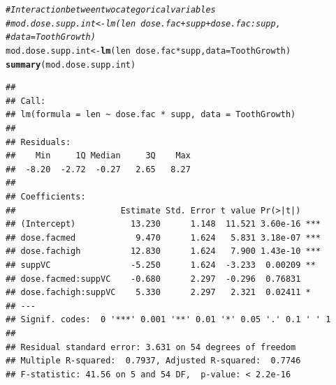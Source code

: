 \documentclass{beamer}\usepackage[]{graphicx}\usepackage[]{color}
\makeatletter
\newcommand{\hlcom}[1]{\textcolor[rgb]{0.678,0.584,0.686}{\textit{#1}}}%
\newcommand{\hlopt}[1]{\textcolor[rgb]{0,0,0}{#1}}%
\newcommand{\hlstd}[1]{\textcolor[rgb]{0.345,0.345,0.345}{#1}}%
\newcommand{\hlkwb}[1]{\textcolor[rgb]{0.69,0.353,0.396}{#1}}%
\newcommand{\hlkwc}[1]{\textcolor[rgb]{0.333,0.667,0.333}{#1}}%
\newcommand{\hlkwd}[1]{\textcolor[rgb]{0.737,0.353,0.396}{\textbf{#1}}}%
\newenvironment{kframe}{%
 \def\at@end@of@kframe{}%
 \ifinner\ifhmode%
  \def\at@end@of@kframe{\end{minipage}}%
  \begin{minipage}{\columnwidth}%
 \fi\fi%
 \def\FrameCommand##1{\hskip\@totalleftmargin \hskip-\fboxsep
 \colorbox{shadecolor}{##1}\hskip-\fboxsep
     \hskip-\linewidth \hskip-\@totalleftmargin \hskip\columnwidth}%
 \MakeFramed {\advance\hsize-\width
   \@totalleftmargin\z@ \linewidth\hsize
   \@setminipage}}%
 {\par\unskip\endMakeFramed%
 \at@end@of@kframe}
\newenvironment{knitrout}{}{} %
\makeatother
\begin{document}
{{{\begin{frame}[fragile]
\begin{knitrout}\tiny
{}\color{fgcolor}\begin{kframe}
\begin{alltt}
\hlcom{# Interaction between two categorical variables}
\hlcom{# mod.dose.supp.int <- lm(len ~ dose.fac + supp + dose.fac:supp,}
\hlcom{# data = ToothGrowth)}
\hlstd{mod.dose.supp.int} \hlkwb{<-} \hlkwd{lm}\hlstd{(len} \hlopt{~} \hlstd{dose.fac} \hlopt{*} \hlstd{supp,} \hlkwc{data} \hlstd{= ToothGrowth)}
\hlkwd{summary}\hlstd{(mod.dose.supp.int)}
\end{alltt}
\begin{verbatim}
## 
## Call:
## lm(formula = len ~ dose.fac * supp, data = ToothGrowth)
## 
## Residuals:
##    Min     1Q Median     3Q    Max 
##  -8.20  -2.72  -0.27   2.65   8.27 
## 
## Coefficients:
##                     Estimate Std. Error t value Pr(>|t|)    
## (Intercept)           13.230      1.148  11.521 3.60e-16 ***
## dose.facmed            9.470      1.624   5.831 3.18e-07 ***
## dose.fachigh          12.830      1.624   7.900 1.43e-10 ***
## suppVC                -5.250      1.624  -3.233  0.00209 ** 
## dose.facmed:suppVC    -0.680      2.297  -0.296  0.76831    
## dose.fachigh:suppVC    5.330      2.297   2.321  0.02411 *  
## ---
## Signif. codes:  0 '***' 0.001 '**' 0.01 '*' 0.05 '.' 0.1 ' ' 1
## 
## Residual standard error: 3.631 on 54 degrees of freedom
## Multiple R-squared:  0.7937,	Adjusted R-squared:  0.7746 
## F-statistic: 41.56 on 5 and 54 DF,  p-value: < 2.2e-16
\end{verbatim}
\end{kframe}
\end{knitrout}
\end{frame}


}}}
\end{document}
